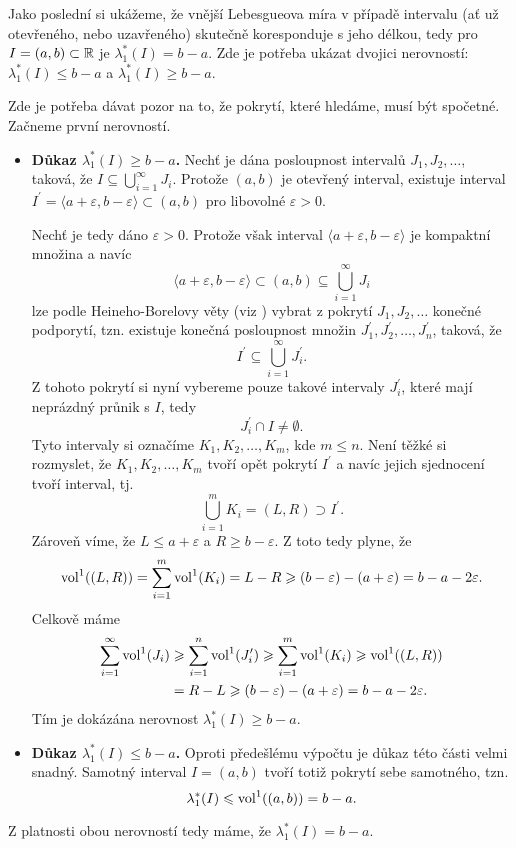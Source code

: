 \begin{example}\label{ex:lebegueova-mira-delka-intervalu}
    Jako poslední si ukážeme, že vnější Lebesgueova míra v případě intervalu (ať už otevřeného, nebo uzavřeného) skutečně koresponduje s jeho délkou, tedy pro $I=(a,b)\subset\mathbb{R}$ je $\lambda_1^*(I)=b-a$. Zde je potřeba ukázat dvojici nerovností: $\lambda_1^*(I)\leqslant b-a$ a $\lambda_1^*(I)\geqslant b-a$.

    Zde je potřeba dávat pozor na to, že pokrytí, které hledáme, musí být spočetné. Začneme první nerovností.

    \begin{itemize}
        \item \textbf{Důkaz $\lambda_1^*(I)\geqslant b-a$.} Nechť je dána posloupnost intervalů $J_1,J_2,\ldots$, taková, že $I\subseteq\bigcup_{i=1}^\infty J_i$. Protože $(a,b)$ je otevřený interval, existuje interval $I^\prime=\langle a+\varepsilon,b-\varepsilon\rangle\subset(a,b)$ pro libovolné $\varepsilon>0$.
        
        Nechť je tedy dáno $\varepsilon>0$. Protože však interval $\langle a+\varepsilon,b-\varepsilon\rangle$ je kompaktní množina a navíc
        \[\langle a+\varepsilon,b-\varepsilon\rangle\subset(a,b)\subseteq\bigcup_{i=1}^\infty J_i\]
        lze podle Heineho-Borelovy věty (viz ) vybrat z pokrytí $J_1,J_2,\ldots$ konečné podporytí, tzn. existuje konečná posloupnost množin $J_1^\prime,J_2^\prime,\ldots,J_n^\prime$, taková, že
        \[I^\prime\subseteq\bigcup_{i=1}^\infty J_i^\prime.\]
        Z tohoto pokrytí si nyní vybereme pouze takové intervaly $J_i^\prime$, které mají neprázdný průnik s $I$, tedy
        \[J_i^\prime\cap I\neq\emptyset.\]
        Tyto intervaly si označíme $K_1,K_2,\ldots,K_m$, kde $m\leqslant n$. Není těžké si rozmyslet, že $K_1,K_2,\ldots,K_m$ tvoří opět pokrytí $I^\prime$ a navíc jejich sjednocení tvoří interval, tj.
        \[\bigcup_{i=1}^m K_i=(L,R)\supset I^\prime.\]
        Zároveň víme, že $L\leqslant a+\varepsilon$ a $R\geqslant b-\varepsilon$. Z toto tedy plyne, že
        \[\operatorname{vol}^1((L,R))=\sum_{i=1}^{m}\operatorname{vol}^1(K_i)=L-R\geqslant (b-\varepsilon)-(a+\varepsilon)=b-a-2\varepsilon.\]
        Celkově máme
        \begin{align*}
            \sum_{i=1}^{\infty}\operatorname{vol}^1(J_i)&\geqslant\sum_{i=1}^{n}\operatorname{vol}^1(J_i^\prime)\geqslant\sum_{i=1}^{m}\operatorname{vol}^1(K_i)\geqslant\operatorname{vol}^1((L,R))\\
            &=R-L\geqslant (b-\varepsilon)-(a+\varepsilon)=b-a-2\varepsilon.
        \end{align*}
        Tím je dokázána nerovnost $\lambda_1^*(I)\geqslant b-a$.
        \item \textbf{Důkaz $\lambda_1^*(I)\leqslant b-a$.} Oproti předešlému výpočtu je důkaz této části velmi snadný. Samotný interval $I=(a,b)$ tvoří totiž pokrytí sebe samotného, tzn.
        \[\lambda_1^*(I)\leqslant\operatorname{vol}^1((a,b))=b-a.\]
    \end{itemize}
    Z platnosti obou nerovností tedy máme, že $\lambda_1^*(I)=b-a$.
\end{example}
